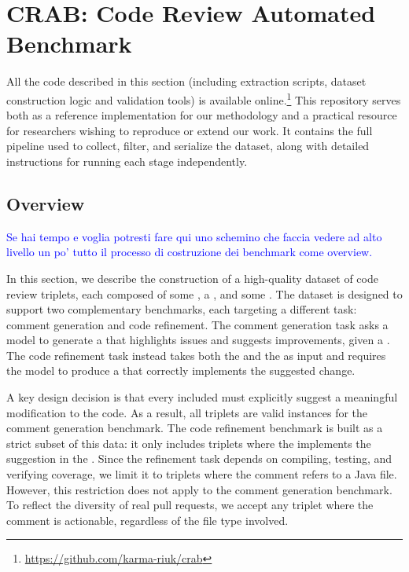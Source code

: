 \section{CRAB: Code Review Automated Benchmark}

All the code described in this section (including extraction scripts, dataset construction logic and
validation tools) is available online.\footnote{\url{https://github.com/karma-riuk/crab}} This
repository serves both as a reference implementation for our methodology and a practical resource
for researchers wishing to reproduce or extend our work. It contains the full pipeline used to
collect, filter, and serialize the dataset, along with detailed instructions for running each stage
independently.

\subsection{Overview}

\textcolor{blue}{Se hai tempo e voglia potresti fare qui uno schemino che faccia vedere ad alto livello un po' tutto il processo di costruzione dei benchmark come overview.}

In this section, we describe the construction of a high-quality dataset of code review triplets,
each composed of some \subCode, a \revComment, and some \revCode. The dataset is designed to support
two complementary benchmarks, each targeting a different task: comment generation and code
refinement. The comment generation task asks a model to generate a \revComment that highlights
issues and suggests improvements, given a \subCode. The code refinement task instead takes both the
\subCode and the \revComment as input and requires the model to produce a \revCode that correctly
implements the suggested change.

A key design decision is that every included \revComment must explicitly suggest a meaningful
modification to the code. As a result, all triplets are valid instances for the comment generation
benchmark. The code refinement benchmark is built as a strict subset of this data: it only includes
triplets where the \revCode implements the suggestion in the \revComment. Since the refinement task
depends on compiling, testing, and verifying coverage, we limit it to triplets where the comment
refers to a Java file. However, this restriction does not apply to the comment generation benchmark.
To reflect the diversity of real pull requests, we accept any triplet where the comment is
actionable, regardless of the file type involved.

